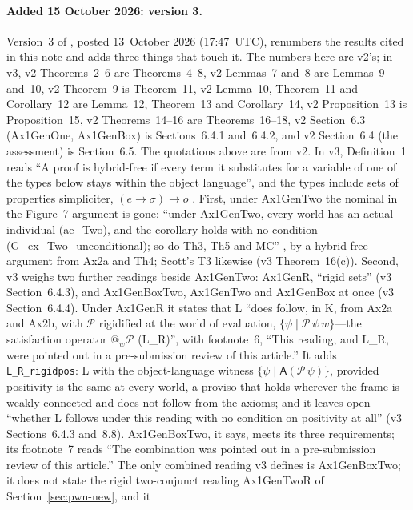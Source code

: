 \documentclass[11pt,a4paper]{article}
\newcommand{\lean}[1]{\texttt{#1}}
\theoremstyle{definition}
\theoremstyle{remark}
\begin{document}
\paragraph{Added 15 October 2026: version 3.}
Version~3 of \cite{benzmuellerPWN2026}, posted 13~October 2026 (17:47~UTC),
renumbers the results cited in this note and adds three things that touch it.
The numbers here are v2's; in v3, v2 Theorems~2--6 are Theorems~4--8, v2
Lemmas~7 and~8 are Lemmas~9 and~10, v2 Theorem~9 is Theorem~11, v2
Lemma~10, Theorem~11 and Corollary~12 are Lemma~12, Theorem~13 and
Corollary~14, v2 Proposition~13 is Proposition~15, v2 Theorems~14--16 are
Theorems~16--18, v2 Section~6.3 (Ax1GenOne, Ax1GenBox) is Sections~6.4.1
and~6.4.2, and v2 Section~6.4 (the assessment) is Section~6.5.
The quotations above are from v2.
In v3, Definition~1 reads ``A proof is hybrid-free if every term it
substitutes for a variable of one of the types below stays within the object
language'', and the types include sets of properties simpliciter,
\((e \to \sigma) \to o\) \cite[v3, Sect.~3]{benzmuellerPWN2026}.
First, under Ax1GenTwo the nominal in the Figure~7 argument is gone: ``under
Ax1GenTwo, every world has an actual individual (ae\_Two), and the corollary
holds with no condition (G\_ex\_Two\_unconditional); so do Th3, Th5 and MC''
\cite[v3, Sect.~6.1, after Corollary~14]{benzmuellerPWN2026}, by a
hybrid-free argument from Ax2a and Th4; Scott's T3 likewise (v3
Theorem~16(c)).
Second, v3 weighs two further readings beside Ax1GenTwo: Ax1GenR, ``rigid
sets'' (v3 Section~6.4.3), and Ax1GenBoxTwo, Ax1GenTwo and Ax1GenBox at once
(v3 Section~6.4.4).
Under Ax1GenR it states that L ``does follow, in K, from Ax2a and Ax2b, with
\(\mathcal{P}\) rigidified at the world of evaluation,
\(\{\psi \mid \mathcal{P}\,\psi\,w\}\)---the satisfaction operator
\(@_w\mathcal{P}\) (L\_R)'', with footnote~6, ``This reading, and L\_R, were
pointed out in a pre-submission review of this article.''
It adds \lean{L\_R\_rigidpos}: L with the object-language witness
\(\{\psi \mid \mathsf{A}(\mathcal{P}\,\psi)\}\), provided positivity is the
same at every world, a proviso that holds wherever the frame is weakly
connected and does not follow from the axioms; and it leaves open ``whether L
follows under this reading with no condition on positivity at all'' (v3
Sections~6.4.3 and~8.8).
Ax1GenBoxTwo, it says, meets its three requirements; its footnote~7 reads
``The combination was pointed out in a pre-submission review of this
article.''
The only combined reading v3 defines is Ax1GenBoxTwo; it does not state the
rigid two-conjunct reading Ax1GenTwoR of Section~\ref{sec:pwn-new}, and it
\end{document}
